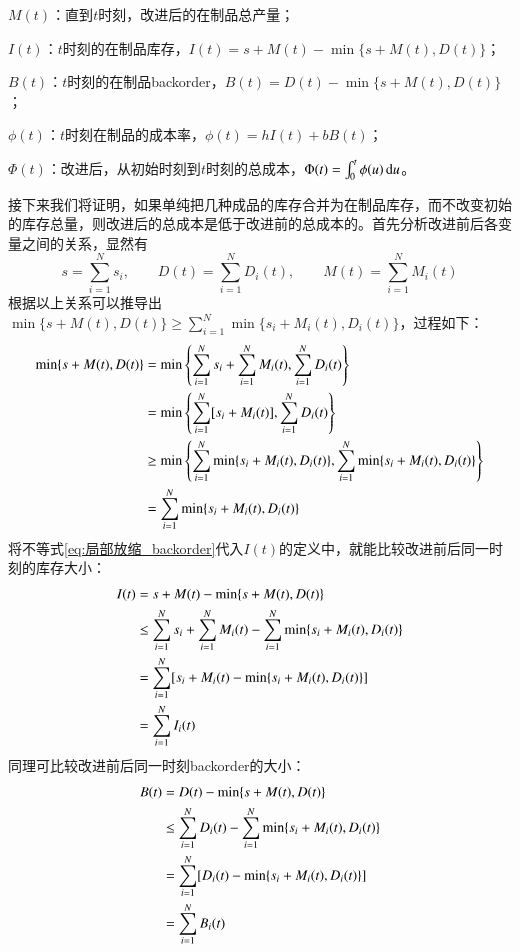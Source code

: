 $M(t)$：直到$t$时刻，改进后的在制品总产量；

$I(t)$：$t$时刻的在制品库存，$I(t)=s+M(t)-\min\{s+M(t),D(t)\}$；

$B(t)$：$t$时刻的在制品backorder，$B(t)=D(t)-\min\{s+M(t),D(t)\}$；

$\phi(t)$：$t$时刻在制品的成本率，$\phi(t)=hI(t)+bB(t)$；

$\Phi(t)$：改进后，从初始时刻到$t$时刻的总成本，$\Phi(t)=\int_0^t\phi(u)\operatorname{d\!} u$。

接下来我们将证明，如果单纯把几种成品的库存合并为在制品库存，而不改变初始的库存总量，则改进后的总成本是低于改进前的总成本的。首先分析改进前后各变量之间的关系，显然有
\begin{equation}
s = \sum_{i=1}^N s_i,\qquad D(t) = \sum_{i=1}^N D_i(t),\qquad M(t) = \sum_{i=1}^N M_i(t)
\label{eq:改进前后的基本关系_backorder}
\end{equation}
根据以上关系可以推导出$\min\{s+M(t),D(t)\}\geq\sum_{i=1}^N\min\{s_i+M_i(t),D_i(t)\}$，过程如下：
\begin{align}
\min\{s+M(t),D(t)\} &= \min\left\{\sum_{i=1}^N s_i+\sum_{i=1}^N M_i(t),\sum_{i=1}^N D_i(t)\right\} \notag \\
&= \min\left\{\sum_{i=1}^N [s_i+M_i(t)],\sum_{i=1}^N D_i(t)\right\} \notag \\
&\geq \min\left\{\sum_{i=1}^N\min\{s_i+M_i(t),D_i(t)\},\sum_{i=1}^N\min\{s_i+M_i(t),D_i(t)\}\right\} \notag \\
&= \sum_{i=1}^N\min\{s_i+M_i(t),D_i(t)\}
\label{eq:局部放缩_backorder}
\end{align}
将不等式\ref{eq:局部放缩_backorder}代入$I(t)$的定义中，就能比较改进前后同一时刻的库存大小：
\begin{align}
I(t) &= s+M(t)-\min\{s+M(t),D(t)\} \notag \\
&\leq \sum_{i=1}^N s_i + \sum_{i=1}^N M_i(t) - \sum_{i=1}^N\min\{s_i+M_i(t),D_i(t)\} \notag \\
&= \sum_{i=1}^N [s_i+M_i(t)-\min\{s_i+M_i(t),D_i(t)\}] \notag \\
&= \sum_{i=1}^N I_i(t)
\label{eq:改进前后同一时刻库存比较_backorder}
\end{align}
同理可比较改进前后同一时刻backorder的大小：
\begin{align}
B(t) &= D(t)-\min\{s+M(t),D(t)\} \notag \\
&\leq \sum_{i=1}^N D_i(t) - \sum_{i=1}^N\min\{s_i+M_i(t),D_i(t)\} \notag \\
&= \sum_{i=1}^N [D_i(t)-\min\{s_i+M_i(t),D_i(t)\}] \notag \\
&= \sum_{i=1}^N B_i(t)
\label{eq:改进前后同一时刻backorder比较_backorder}
\end{align}
